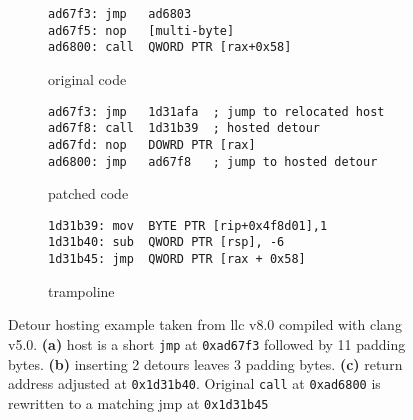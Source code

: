 \begin{figure}[t!]
	\centering
	\vspace{-4pt}
	\begin{subfigure}[t]{\columnwidth}
\begin{lstlisting}[style=custom-x64]
ad67f3: jmp   ad6803
ad67f5: nop   [multi-byte]
ad6800: call  QWORD PTR [rax+0x58]
\end{lstlisting}
		\vspace{-4pt}
		\caption{original code}
		\label{fig:5:original}
	\end{subfigure}
	\begin{subfigure}[t]{\columnwidth}
\begin{lstlisting}[style=custom-x64]
ad67f3: jmp   1d31afa  ; jump to relocated host
ad67f8: call  1d31b39  ; hosted detour
ad67fd: nop   DOWRD PTR [rax]
ad6800: jmp   ad67f8   ; jump to hosted detour
\end{lstlisting}
		\vspace{-4pt}
		\caption{patched code}
		\label{fig:5:patch}
	\end{subfigure}
	\hfill
	\begin{subfigure}[t]{\columnwidth}
		\vspace{-4pt}
\begin{lstlisting}[style=custom-x64]
1d31b39: mov  BYTE PTR [rip+0x4f8d01],1
1d31b40: sub  QWORD PTR [rsp], -6
1d31b45: jmp  QWORD PTR [rax + 0x58]
\end{lstlisting}
		\vspace{-4pt}
		\caption{trampoline}
		\label{fig:5:guest-trampoline}
	\end{subfigure}
	
	\caption{Detour hosting example taken from \textsf{llc} v8.0 compiled with \textsf{clang} v5.0.
		\textbf{(a)} host is a short \texttt{jmp} at \texttt{0xad67f3} followed by 11 padding bytes.
		\textbf{(b)} inserting 2 detours leaves 3 padding bytes.
		\textbf{(c)} return address adjusted at \texttt{0x1d31b40}. Original \texttt{call} at \texttt{0xad6800} is rewritten to a matching \textsf{jmp} at \texttt{0x1d31b45}}
	\label{fig:detour-hosting}
\end{figure}


